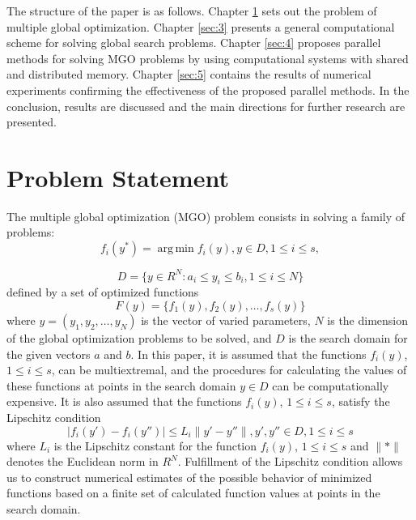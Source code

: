 \documentclass[review]{elsarticle}
\DeclareMathOperator*{\argmin}{arg\,min}
\begin{document}
The structure of the paper is as follows. Chapter \ref{sec:2} sets out the problem of multiple global optimization. Chapter \ref{sec:3} presents a general computational scheme for solving global search problems. Chapter \ref{sec:4} proposes parallel methods for solving MGO problems by using computational systems with shared and distributed memory. Chapter \ref{sec:5} contains the results of numerical experiments confirming the effectiveness of the proposed parallel methods. In the conclusion, results are discussed and the main directions for further research are presented.

\section{Problem Statement}\label{sec:2}

The multiple global optimization (MGO) problem consists in solving a family of problems:
\begin{equation}\label{eq:1}
f_i(y^*) = \argmin f_i(y), y \in D, 1 \leq i \leq s,
\end{equation}

\begin{equation}\label{eq:2}
D  = \{ y\in R^N: a_i \leq y_i \leq b_i, 1 \leq i \leq N \}
\end{equation}
defined by a set of optimized functions
\begin{equation}\label{eq:3}
F(y) = \{ f_1(y),  f_2(y),\dots, f_s(y) \}
\end{equation}
where $y = (y_1,y_2,\dots,y_N)$ is the vector of varied parameters, $N$ is the dimension of the global optimization problems to be solved, and $D$ is the search domain for the given vectors $a$ and $b$. 
In this paper, it is assumed that the functions $f_i(y)$, $1 \leq i \leq s$, can be multiextremal, and the procedures for calculating the values of these functions at points in the search domain $y \in D$ can be computationally expensive. It is also assumed that the functions $f_i(y)$, $1 \leq i \leq s$, satisfy the Lipschitz condition
\begin{equation}\label{eq:4}
|f_i (y')-f_i (y'')| \leq L_i \|y'-y''\|, y',y''\in D, 1 \leq i \leq s
\end{equation}
where $L_i$ is the Lipschitz constant for the function $f_i(y)$, $1 \leq i \leq s$ and ${\|*\|}$ denotes the Euclidean norm in $R^N$. Fulfillment of the Lipschitz condition allows us to construct numerical estimates of the possible behavior of minimized functions based on a finite set of calculated function values at points in the search domain.
\end{document}
